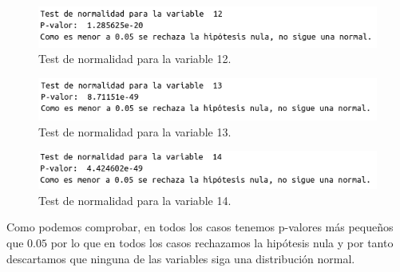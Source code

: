 \documentclass[12pt,a4paper]{article}
\begin{document}
\begin{figure}[H]
	\centering
	\includegraphics[scale=0.6]{./Imagenes/EDA/Clasificacion/test_normalidad12.png}
	\caption{Test de normalidad para la variable 12.}
\end{figure}

\begin{figure}[H]
	\centering
	\includegraphics[scale=0.6]{./Imagenes/EDA/Clasificacion/test_normalidad13.png}
	\caption{Test de normalidad para la variable 13.}
\end{figure}

\begin{figure}[H]
	\centering
	\includegraphics[scale=0.6]{./Imagenes/EDA/Clasificacion/test_normalidad14.png}
	\caption{Test de normalidad para la variable 14.}
\end{figure}

Como podemos comprobar, en todos los casos tenemos p-valores más pequeños que $0.05$ por lo que en todos los casos rechazamos la hipótesis nula y por tanto descartamos que ninguna de las variables siga una distribución normal.
\end{document}
